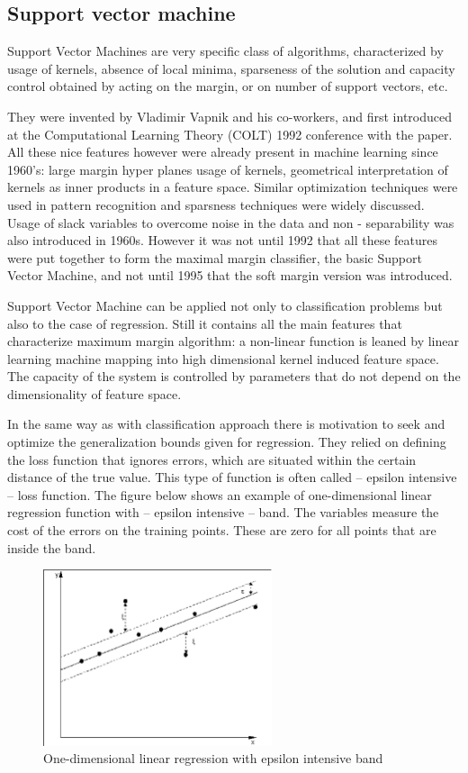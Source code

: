 \subsection{Support vector machine}
Support Vector Machines are very specific class of algorithms, 
characterized by usage of kernels, absence of local minima, sparseness of the solution and 
capacity control obtained by acting on the margin, or on number of support vectors, etc.

They were invented by Vladimir Vapnik and his co-workers, 
and first introduced at the Computational Learning Theory (COLT) 1992 conference with the paper.
All these nice features however were already present in machine learning since 1960’s: 
large margin hyper planes usage of kernels, geometrical interpretation of kernels as inner
products in a feature space.
Similar optimization techniques were used in pattern recognition and sparsness techniques 
were widely discussed.
Usage of slack variables to overcome noise in the data and non - separability was also
introduced in 1960s.
However it was not until 1992 that all these features were put together to form the
maximal margin classifier, the basic Support Vector Machine, and not until 1995 that the
soft margin version was introduced.

Support Vector Machine can be applied not only to classification problems but also to the
case of regression.
Still it contains all the main features that characterize maximum margin algorithm:
a non-linear function is leaned by linear learning machine mapping into high dimensional kernel
induced feature space.
The capacity of the system is controlled by parameters that do not depend on the dimensionality
of feature space.

In the same way as with classification approach there is motivation to seek and optimize the
generalization bounds given for regression.
They relied on defining the loss function that ignores errors, which are situated within
the certain distance of the true value.
This type of function is often called – epsilon intensive – loss function. 
The figure below shows an example of one-dimensional linear regression function with – 
epsilon intensive – band. The variables measure the cost of the errors on the training points.
These are zero for all points that are inside the band. 
\begin{figure}[htb] 
	\label{fig:svm1}
	\centering
	\includegraphics[width=0.6\textwidth]{figures/svm1}
	\caption{One-dimensional linear regression with epsilon intensive band}
\end{figure}

